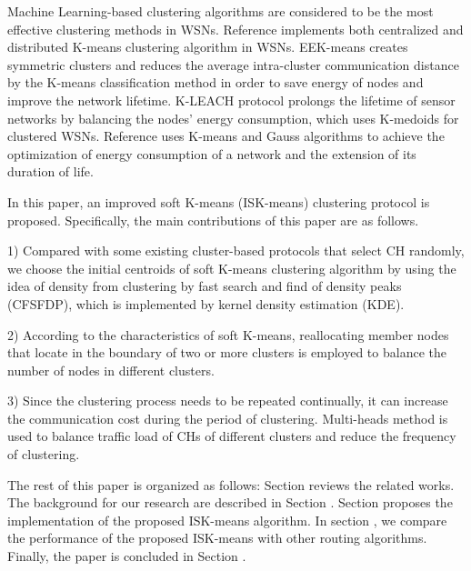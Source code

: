 \documentclass[journal,twoside,web]{ieeecolor}
\begin{document}
Machine Learning-based clustering algorithms are considered to be the most effective clustering methods in WSNs. Reference \cite{b4} implements both centralized and distributed K-means clustering algorithm in WSNs. EEK-means\cite{b5} creates symmetric clusters and reduces the average intra-cluster communication distance by the K-means classification method in order to save energy of nodes and improve the network lifetime.  K-LEACH protocol \cite{b6}  prolongs the lifetime of sensor networks by balancing the nodes' energy consumption, which uses K-medoids for clustered WSNs. Reference  \cite{b7} uses K-means and Gauss algorithms to achieve the optimization of energy consumption of a network and the extension of its duration of life. 


In this paper, an improved soft K-means (ISK-means) clustering protocol is proposed. Specifically, the main contributions of this paper are as follows.

1) Compared with some existing cluster-based protocols that select CH randomly, we choose the initial centroids of soft K-means clustering algorithm \cite{b8} by using the idea of density from clustering by fast search and find of density peaks (CFSFDP), which is implemented by kernel density estimation (KDE). 

2) According to the characteristics of soft K-means, reallocating member nodes that locate in the boundary of two or more clusters is employed to balance the number of nodes in different clusters.
 
3) Since the clustering process needs to be repeated continually, it can increase the communication cost during the period of clustering. Multi-heads method is used to balance traffic load of CHs of different clusters and reduce the frequency of clustering.

The rest of this paper is organized as follows: Section \uppercase\expandafter{} reviews the related works. The background for our research are described in Section \uppercase\expandafter{}. Section \uppercase\expandafter{} proposes the implementation of the proposed ISK-means algorithm. In section \uppercase\expandafter{}, we compare the performance of the proposed ISK-means with other routing algorithms. Finally, the paper is concluded in Section \uppercase\expandafter{}.
\end{document}
